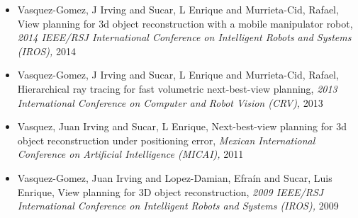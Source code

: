 \begin{itemize}
\item Vasquez-Gomez, J Irving and Sucar, L Enrique and Murrieta-Cid, Rafael, View planning for 3d object reconstruction with a mobile manipulator robot, \textit{ 2014 IEEE/RSJ International Conference on Intelligent Robots and Systems (IROS),} 2014 
\item Vasquez-Gomez, J Irving and Sucar, L Enrique and Murrieta-Cid, Rafael, Hierarchical ray tracing for fast volumetric next-best-view planning, \textit{ 2013 International Conference on Computer and Robot Vision (CRV),} 2013 
\item Vasquez, Juan Irving and Sucar, L Enrique, Next-best-view planning for 3d object reconstruction under positioning error, \textit{ Mexican International Conference on Artificial Intelligence (MICAI),} 2011 
\item Vasquez-Gomez, Juan Irving and Lopez-Damian, Efraín and Sucar, Luis Enrique, View planning for 3D object reconstruction, \textit{ 2009 IEEE/RSJ International Conference on Intelligent Robots and Systems (IROS),} 2009 
\end{itemize} 
